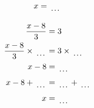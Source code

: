 \documentclass[12pt]{article}
\newcounter{minipagecount}
\begin{document}
\begin{multicols}{2}
\begin{minipage}[t]{0.45\textwidth}
\begin{align*}
        x &= \dotuline{\hspace{5mm}}\\
    \end{align*}
\end{minipage} %
\noindent{(\theminipagecount)}\hspace{0.1mm} %
\begin{minipage}[t]{0.45\textwidth} %
    \vspace{-26pt}  %
    \raggedright %
    \begin{align*} %
        \frac{x - 8}{3} &= 3\\
        \frac{x - 8}{3} \times\dotuline{\hspace{5mm}} &= 3 \times\dotuline{\hspace{5mm}}\\
        x - 8 &= \dotuline{\hspace{5mm}}\\
        x - 8 + \dotuline{\hspace{5mm}} &= \dotuline{\hspace{5mm}} + \dotuline{\hspace{5mm}}\\
        x &= \dotuline{\hspace{5mm}}\\
    \end{align*}
\end{minipage} %
\noindent{(\theminipagecount)}\hspace{0.1mm} %
\begin{minipage}[t]{0.45\textwidth} %
    \vspace{-26pt}  %

\end{minipage}
\end{multicols}
\end{document}
